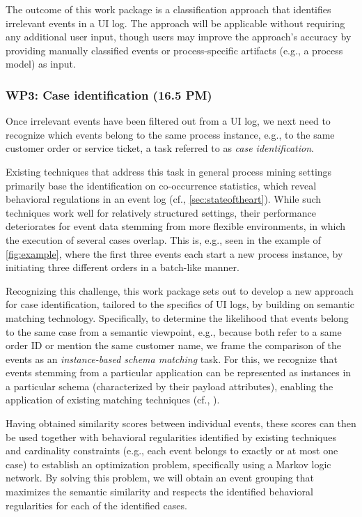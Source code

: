 The outcome of this work package is a classification approach that identifies irrelevant events in a UI log. The approach will be applicable without requiring any additional user input, though users may improve the approach's accuracy by providing manually classified events or process-specific artifacts (e.g., a process model) as input.

\subsubsection{WP3: Case identification (16.5 PM)}
\label{sec:wp3}

Once irrelevant events have been filtered out from  a UI log, we next need to recognize which events belong to the same process instance, e.g., to the same customer order or service ticket, a task referred to as \emph{case identification}.

Existing techniques that address this task in general process mining settings primarily base the identification on co-occurrence statistics, which reveal behavioral regulations in an event log (cf., \autoref{sec:stateoftheart}). While such techniques work well for relatively structured settings, their performance deteriorates for event data stemming from more flexible environments, in which the execution of several cases overlap. This is, e.g., seen in the example of \autoref{fig:example}, where the first three events each start a new process instance, by initiating three different orders in a batch-like manner.

Recognizing this challenge, this work package sets out to develop a new approach for case identification, tailored to the specifics of UI logs, by building on semantic matching technology.
Specifically, to determine the likelihood that events belong to the same case from a semantic viewpoint, e.g., because both refer to a same order ID or mention the same customer name, we frame the comparison of the events as an \emph{instance-based schema matching} task. For this, we recognize that events stemming from a particular application can be represented as instances in a particular schema (characterized by their payload attributes), enabling the application of existing matching techniques (cf., \cite{rinaldi2018matching,lehmberg2017stitching}).

 Having obtained similarity scores between individual events, these scores can then be used together with behavioral regularities identified by existing techniques~\cite{diba2020extraction,ferreira2009discovering} and cardinality constraints (e.g., each event belongs to exactly or at most one case) to establish an optimization problem, specifically using a Markov logic network. By solving this problem, we will obtain an event grouping that maximizes the semantic similarity and respects the identified behavioral regularities for each of the identified cases.

